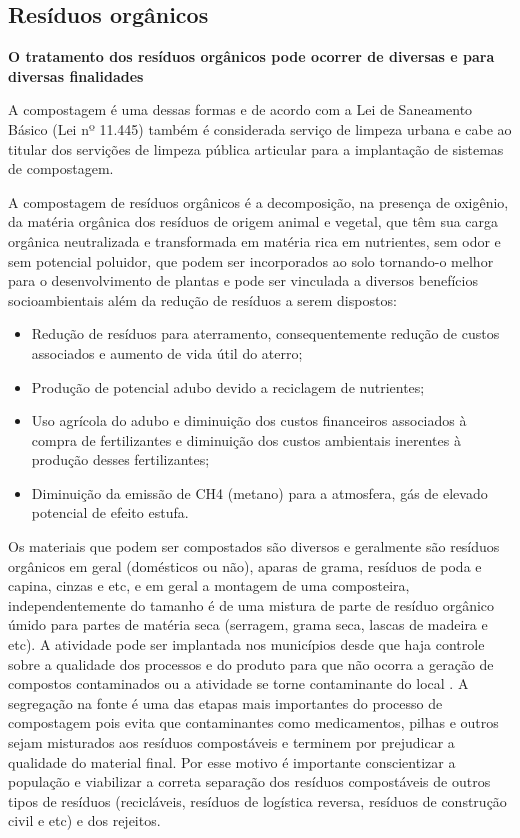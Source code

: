 \subsection{Resíduos orgânicos}

\textbf{	O tratamento dos resíduos orgânicos pode ocorrer de diversas e para diversas finalidades}

A compostagem é uma dessas formas e de acordo com a Lei de Saneamento Básico (Lei nº 11.445) também é considerada serviço de limpeza urbana e cabe ao titular dos servições de limpeza pública articular para a implantação de sistemas de compostagem.

A compostagem de resíduos orgânicos é a decomposição, na presença de oxigênio, da matéria orgânica dos resíduos de origem animal e vegetal, que têm sua carga orgânica neutralizada e transformada em matéria rica em nutrientes, sem odor e sem potencial poluidor, que podem ser incorporados ao solo tornando-o melhor para o desenvolvimento de plantas e pode ser vinculada a diversos benefícios socioambientais além da redução de resíduos a serem dispostos:

\begin{itemize}
	\item Redução de resíduos para aterramento, consequentemente redução de custos associados e aumento de vida útil do aterro;
	\item Produção de potencial adubo devido a reciclagem de nutrientes;
	\item Uso agrícola do adubo e diminuição dos custos financeiros associados à compra de fertilizantes e diminuição dos custos ambientais inerentes à produção desses fertilizantes;
	\item Diminuição da emissão de CH4 (metano) para a atmosfera, gás de elevado potencial de efeito estufa. 
\end{itemize}

Os materiais que podem ser compostados são diversos e geralmente são resíduos orgânicos em geral (domésticos ou não), aparas de grama, resíduos de poda e capina, cinzas e etc, e em geral a montagem de uma composteira, independentemente do tamanho é de uma mistura de parte de resíduo orgânico úmido para partes de matéria seca (serragem, grama seca, lascas de madeira e etc). A atividade pode ser implantada nos municípios desde que haja controle sobre a qualidade dos processos e do produto para que não ocorra a geração de compostos contaminados ou a atividade se torne contaminante do local \cite{felipetto_conceito_2007}. A segregação na fonte é uma das etapas mais importantes do processo de compostagem pois evita que contaminantes como medicamentos, pilhas e outros sejam misturados aos resíduos compostáveis e terminem por prejudicar a qualidade do material final. Por esse motivo é importante conscientizar a população e viabilizar a correta separação dos resíduos compostáveis de outros tipos de resíduos (recicláveis, resíduos de logística reversa, resíduos de construção civil e etc) e dos rejeitos.

